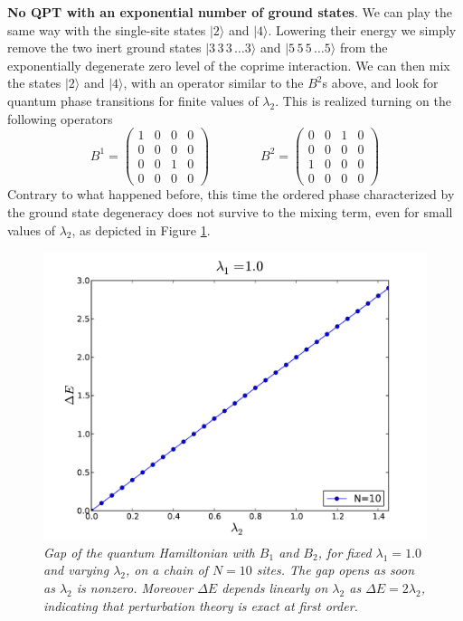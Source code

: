 \documentclass[aps,pra,superscriptaddress]{revtex4}
\newcommand\be            {\begin{equation}}
\newcommand\ee            {\end{equation}}
\renewcommand{\(}{\left(}
\renewcommand{\)}{\right)}
\renewcommand{\[}{\left[}
\renewcommand{\]}{\right]}
\newcommand\ket[1]{|#1\rangle}
\begin{document}
\vspace{3mm}
\noindent 
{\bf No QPT with an exponential number of ground states}. We can play the same way with the single-site states $\ket{2}$ and $\ket{4}$. Lowering their energy we simply remove the two inert ground states $\ket{3\,3\,3\, \dots 3 }$ and $\ket{5\,5\,5\, \dots 5 }$ from the exponentially degenerate zero level of the coprime interaction. We can then mix the states $\ket{2}$ and $\ket{4}$, with an operator similar to the $B^2$s above, and look for quantum phase transitions for finite values of $\lambda_2$. This is realized turning on the following operators
\be 
B^1 = 
\begin{pmatrix}
1 & 0 & 0 & 0 \\
0 & 0 & 0 & 0 \\
0 & 0 & 1 & 0 \\
0 & 0 & 0 & 0 
\end{pmatrix}
\qquad
\qquad
B^2 = 
\begin{pmatrix}
0 & 0 & 1 & 0 \\
0 & 0 & 0 & 0 \\
1 & 0 & 0 & 0 \\
0 & 0 & 0 & 0 
\end{pmatrix}
\ee
Contrary to what happened before, this time the ordered phase characterized by the ground state degeneracy does not survive to the mixing term, even for small values of $\lambda_2$, as depicted in Figure \ref{gap4}.
\begin{figure}[H]
\center
\includegraphics[scale=0.5]{Figures/gap4.pdf}
\caption{{\em Gap of the quantum Hamiltonian with $B_1$ and $B_2$, for fixed $\lambda_1=1.0$ and varying $\lambda_2$, on a chain of $N=10$ sites. The gap opens as soon as $\lambda_2$ is nonzero. Moreover $\Delta E$ depends linearly on $\lambda_2$ as $\Delta E = 2 \lambda_2$, indicating that perturbation theory is exact at first order. }}
\label{gap4}
\end{figure}
\end{document}
